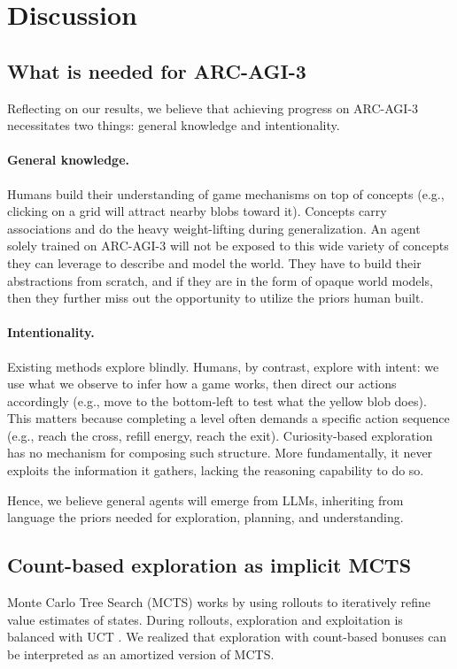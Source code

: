 \documentclass{article}
\begin{document}
\section{Discussion}

\subsection{What is needed for ARC-AGI-3}
\label{sec:needed}
Reflecting on our results, we believe that achieving progress on ARC-AGI-3 necessitates two things: general knowledge and intentionality.

\paragraph{General knowledge.} Humans build their understanding of game mechanisms on top of concepts (e.g., clicking on a grid will attract nearby blobs toward it). Concepts carry associations and do the heavy weight-lifting during generalization. An agent solely trained on ARC-AGI-3 will not be exposed to this wide variety of concepts they can leverage to describe and model the world. They have to build their abstractions from scratch, and if they are in the form of opaque world models, then they further miss out the opportunity to utilize the priors human built.

\paragraph{Intentionality.} Existing methods explore blindly. Humans, by contrast, explore with intent: we use what we observe to infer how a game works, then direct our actions accordingly (e.g., move to the bottom-left to test what the yellow blob does). This matters because completing a level often demands a specific action sequence (e.g., reach the cross, refill energy, reach the exit). Curiosity-based exploration has no mechanism for composing such structure. More fundamentally, it never exploits the information it gathers, lacking the reasoning capability to do so.

Hence, we believe general agents will emerge from LLMs, inheriting from language the priors needed for exploration, planning, and understanding.

\subsection{Count-based exploration as implicit MCTS}
Monte Carlo Tree Search (MCTS) works by using rollouts to iteratively refine value estimates of states. During rollouts, exploration and exploitation is balanced with UCT \citep{hutchison_bandit_2006}. We realized that exploration with count-based bonuses can be interpreted as an amortized version of MCTS.
\end{document}
